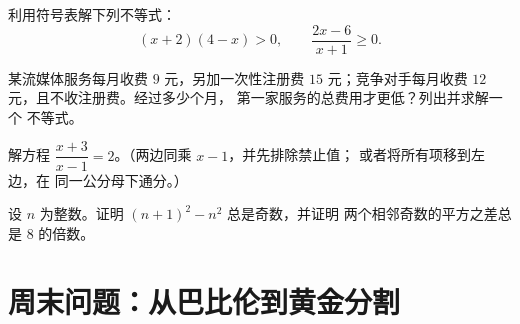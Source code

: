 \begin{exercise}[$\star\star$]\label{exo:g10:algebra:8}
       利用符号表解下列不等式：
\[
(x + 2)(4 - x) > 0,
\qquad
\frac{2x - 6}{x + 1} \geq 0 .
\]
\end{exercise}

\begin{exercise}[$\star\star$]\label{exo:g10:algebra:9}
       某流媒体服务每月收费 $9$ 元，另加一次性注册费
       $15$ 元；竞争对手每月收费 $12$ 元，且不收注册费。经过多少个月，
       第一家服务的总费用才更低？列出并求解一个
       不等式。
\end{exercise}

\begin{exercise}[$\star\star$]\label{exo:g10:algebra:10}
       解方程 $\dfrac{x+3}{x-1} = 2$。（两边同乘 $x - 1$，并先排除禁止值；
       或者将所有项移到左边，在
       同一公分母下通分。）
\end{exercise}

\begin{exercise}[$\star\star\star$]\label{exo:g10:algebra:11}
       设 $n$ 为整数。证明 $(n + 1)^2 - n^2$ 总是奇数，并证明
       两个相邻奇数的平方之差总是
       $8$ 的倍数。
\end{exercise}

\section{周末问题：从巴比伦到黄金分割}

